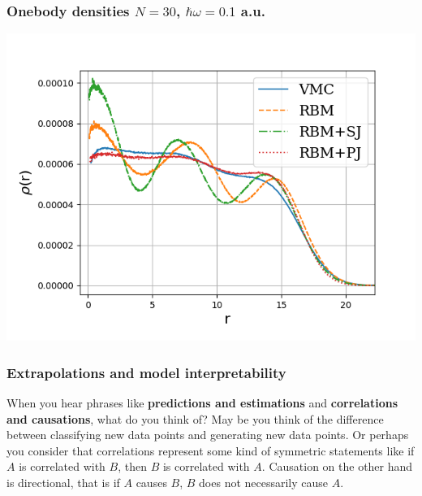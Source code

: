 \documentclass{beamer}
\begin{document}
\begin{frame}
\frametitle{Onebody densities $N=30$, $\hbar\omega=0.1$ a.u.}

\begin{block}{}

\vspace{6mm}

\centerline{\includegraphics[width=0.9\linewidth]{figures/OB30hw01.png}}

\vspace{6mm}

\end{block}
\end{frame}

\begin{frame}
\frametitle{Extrapolations and model interpretability}

When you hear phrases like \textbf{predictions and estimations} and
\textbf{correlations and causations}, what do you think of?  May be you think
of the difference between classifying new data points and generating
new data points.
Or perhaps you consider that correlations represent some kind of symmetric statements like
if $A$ is correlated with $B$, then $B$ is correlated with
$A$. Causation on the other hand is directional, that is if $A$ causes $B$, $B$ does not
necessarily cause $A$.
\end{frame}
\end{document}

